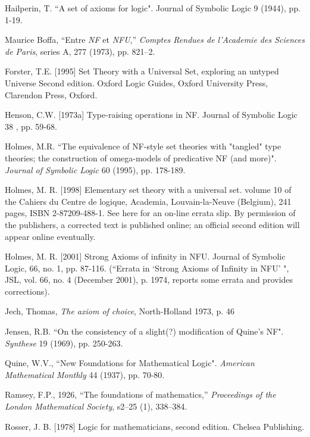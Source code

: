 \documentclass{article}
\begin{document}
\begin{thebibliography}{99}

  Hailperin, T.  
``A set of axioms for logic". 
Journal of Symbolic Logic 9 (1944), pp. 1-19.

 Maurice Boffa, ``Entre {\em NF\/} et {\em
NFU\/},'' {\em Comptes Rendues de l'Academie des Sciences de
Paris\/}, series A, 277 (1973), pp. 821--2.

  Forster, T.E. [1995] 
Set Theory with a Universal Set, exploring an untyped Universe 
Second edition. Oxford Logic Guides, Oxford University Press, Clarendon Press, Oxford.

   Henson, C.W. [1973a] 
Type-raising operations in NF. 
Journal of Symbolic Logic 38 , pp. 59-68.

  Holmes, M.R.
``The equivalence of NF-style set theories with "tangled" type theories; the construction of omega-models of predicative NF (and more)". 
{\em Journal of Symbolic Logic\/} 60 (1995), pp. 178-189.

  Holmes, M. R. [1998] 
Elementary set theory with a universal set. 
volume 10 of the Cahiers du Centre de logique, Academia, Louvain-la-Neuve (Belgium), 241 pages, ISBN 2-87209-488-1. See here for an on-line errata slip. By permission of the publishers, a corrected text is published online; an official second edition will appear online eventually.

   Holmes, M. R. [2001]
Strong Axioms of infinity in NFU.
Journal of Symbolic Logic, 66, no. 1, pp. 87-116.  \newline(``Errata in `Strong
Axioms of Infinity in NFU' ", JSL, vol. 66, no. 4 (December
2001), p. 1974, reports some errata and provides corrections).

  Jech, Thomas, {\em The axiom of choice\/}, North-Holland 1973, p. 46

  Jensen, R.B.
``On the consistency of a slight(?) modification of Quine's NF". 
{\em Synthese\/} 19 (1969), pp. 250-263.

  Quine, W.V.,
``New Foundations for Mathematical Logic". 
{\em American Mathematical Monthly\/} 44 (1937), pp. 70-80. 

  Ramsey, F.P., 1926, ``The foundations of mathematics,”   {\em Proceedings of the London Mathematical Society\/}, s2–25 (1), 338–384.

  Rosser, J. B. [1978] 
Logic for mathematicians, second edition. 
Chelsea Publishing.


\end{thebibliography}
\end{document}
